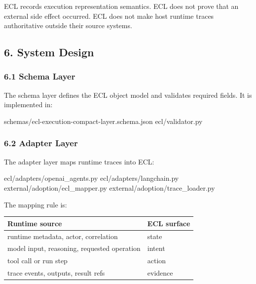 \documentclass[
]{article}
\newenvironment{Shaded}{}{}
\newcommand{\NormalTok}[1]{#1}
\newcounter{none} %
\begin{document}
\begin{Shaded}
\begin{Highlighting}[]
\NormalTok{ECL records execution representation semantics.}
\NormalTok{ECL does not prove that an external side effect occurred.}
\NormalTok{ECL does not make host runtime traces authoritative outside their source systems.}
\end{Highlighting}
\end{Shaded}

\subsection{6. System Design}\label{system-design}

\subsubsection{6.1 Schema Layer}\label{schema-layer}

The schema layer defines the ECL object model and validates required
fields. It is implemented in:

\begin{Shaded}
\begin{Highlighting}[]
\NormalTok{schemas/ecl{-}execution{-}compact{-}layer.schema.json}
\NormalTok{ecl/validator.py}
\end{Highlighting}
\end{Shaded}

\subsubsection{6.2 Adapter Layer}\label{adapter-layer}

The adapter layer maps runtime traces into ECL:

\begin{Shaded}
\begin{Highlighting}[]
\NormalTok{ecl/adapters/openai\_agents.py}
\NormalTok{ecl/adapters/langchain.py}
\NormalTok{external/adoption/ecl\_mapper.py}
\NormalTok{external/adoption/trace\_loader.py}
\end{Highlighting}
\end{Shaded}

The mapping rule is:

{\def\LTcaptype{none} %
\begin{longtable}[]{@{}ll@{}}
\toprule\noalign{}
Runtime source & ECL surface \\
\midrule\noalign{}
\endhead
\bottomrule\noalign{}
\endlastfoot
runtime metadata, actor, correlation & state \\
model input, reasoning, requested operation & intent \\
tool call or run step & action \\
trace events, outputs, result refs & evidence \\
\end{longtable}
}
\end{document}

